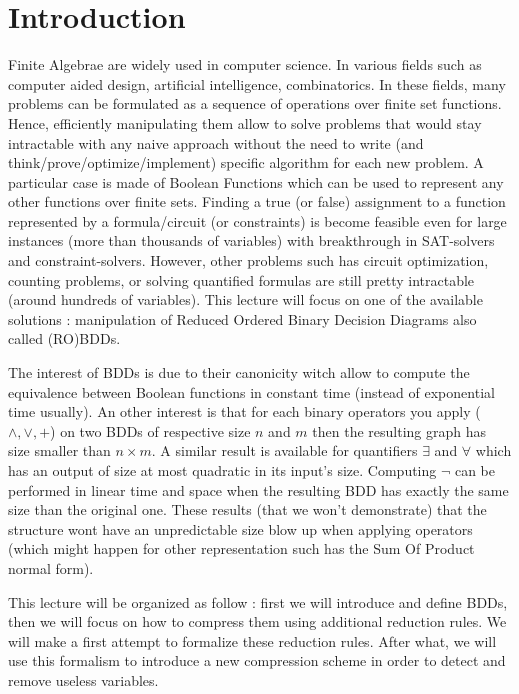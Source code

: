 \documentclass[a4paper,10pt]{article}
\begin{document}
\section{Introduction}
Finite Algebrae are widely used in computer science.
In various fields such as computer aided design, artificial intelligence, combinatorics.
In these fields, many problems can be formulated as a sequence of operations over finite set functions. Hence, efficiently manipulating them allow to solve problems that would stay intractable with any naive approach without the need to write (and think/prove/optimize/implement) specific algorithm for each new problem.
A particular case is made of Boolean Functions which can be used to represent any other functions over finite sets.
Finding a true (or false) assignment to a function represented by a formula/circuit (or constraints) is become feasible even for large instances (more than thousands of variables) with breakthrough in SAT-solvers and constraint-solvers.
However, other problems such has circuit optimization, counting problems, or solving quantified formulas are still pretty intractable (around hundreds of variables).
This lecture will focus on one of the available solutions : manipulation of Reduced Ordered Binary Decision Diagrams also called (RO)BDDs.

The interest of BDDs is due to their canonicity witch allow to compute the equivalence between Boolean functions in constant time (instead of exponential time usually).
An other interest is that for each binary operators you apply ($\land, \lor, +$) on two BDDs of respective size $n$ and $m$ then the resulting graph has size smaller than $n\times m$.
A similar result is available for quantifiers $\exists$ and $\forall$ which has an output of size at most quadratic in its input's size.
Computing $\lnot$ can be performed in linear time and space when the resulting BDD has exactly the same size than the original one.
These results (that we won't demonstrate) that the structure wont have an unpredictable size blow up when applying operators (which might happen for other representation such has the Sum Of Product normal form).


This lecture will be organized as follow : first we will introduce and define BDDs, then we will focus on how to compress them using additional reduction rules.
We will make a first attempt to formalize these reduction rules.
After what, we will use this formalism to introduce a new compression scheme in order to detect and remove useless variables.
\end{document}
